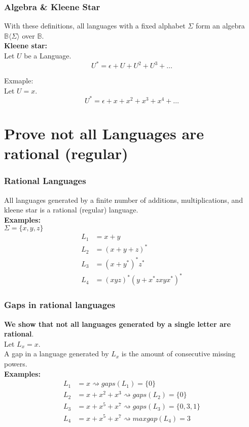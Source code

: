 \documentclass{beamer}
\begin{document}
\begin{frame}
  \frametitle{Algebra \& Kleene Star}
  With these definitions, all languages with a fixed alphabet $\Sigma$
  form an algebra $\mathbb{B}\langle \Sigma \rangle $ over $\mathbb{B}$.\\
  \vspace*{1cm}
  {\bf Kleene star:} \\
  Let $U$ be a Language.\\
  \[ U^* = \epsilon + U + U^2 + U^3 + \dots \]

  Exmaple:\\
  Let $U = x$.
  \[ U^* = \epsilon + x  + x^2 + x^3 + x^4 + \dots \]

  
\end{frame}

\section{Prove not all Languages are rational (regular)}
\begin{frame}
  \frametitle{Rational Languages}
  All languages generated by a finite number of additions, multiplications, 
  and kleene star is a rational (regular) language.\\
  {\bf Examples:}\\
  $\Sigma = \{x, y, z\}$ 
  \begin{align}
    L_1 &= x+y \\
    L_2 &=(x+y+z)^* \\
    L_3 &= (x+y^*)^*z^*\\
    L_4 &=(xyz)^*(y+x^*zxyx^*)^*
  \end{align}
\end{frame}
\begin{frame}
  \frametitle{Gaps in rational languages}
  {\bf We show that not all languages generated 
  by a single letter are rational}.\\
  Let $L_x = x$.\\
  A gap in a language generated by $L_x$ is the
  amount of consecutive missing powers.\\
  {\bf Examples:}\\
  \begin{align*}
    L_1 &= x \rightsquigarrow gaps(L_1) = \{0\} \\ 
    L_2 &= x + x^2 + x^3 \rightsquigarrow gaps(L_2) = \{0\} \\
    L_3 &= x + x^5 + x^7 \rightsquigarrow gaps(L_3) = \{0,3,1\} \\
    L_4 &= x + x^5 + x^7 \rightsquigarrow maxgap(L_4) = 3
  \end{align*}
\end{frame}
\end{document}
